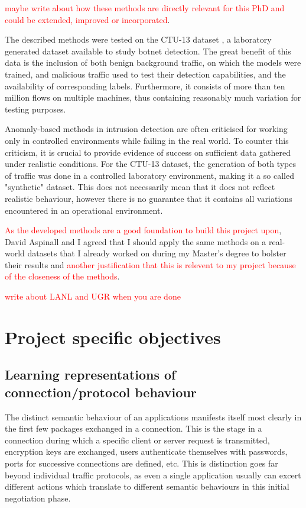 \documentclass[a4paper,12pt,twoside]{report}
\begin{document}
\textcolor{red}{maybe write about how these methods are directly relevant for this PhD and could be extended, improved or incorporated}.

The described methods were tested on the CTU-13 dataset \cite{garcia2014empirical}, a laboratory generated dataset available to study botnet detection. The great benefit of this data is the inclusion of both benign background traffic, on which the models were trained, and malicious traffic used to test their detection capabilities, and the availability of corresponding labels. Furthermore, it consists of more than ten million flows on multiple machines, thus containing reasonably much variation for testing purposes.

Anomaly-based methods in intrusion detection are often criticised for working only in controlled environments while failing in the real world. To counter this criticism, it is crucial to provide evidence of success on sufficient data gathered under realistic conditions. For the CTU-13 dataset, the generation of both types of traffic was done in a controlled laboratory environment, making it a so called "synthetic" dataset. This does not necessarily mean that it does not reflect realistic behaviour, however there is no guarantee that it contains all variations encountered in an operational environment. 

\textcolor{red}{As the developed methods are a good foundation to build this project upon}, David Aspinall and I agreed that I should apply the same methods on a real-world datasets that I already worked on during my Master's degree to bolster their results and \textcolor{red}{another justification that this is relevent to my project because of the closeness of the methods}. 

\textcolor{red}{write about LANL and UGR when you are done}

\section{Project specific objectives}


\subsection{Learning representations of connection/protocol behaviour}

The distinct semantic behaviour of an applications manifests itself most clearly in the first few packages exchanged in a connection. This is the stage in a connection during which a specific client or server request is transmitted, encryption keys are exchanged, users authenticate themselves with passwords, ports for successive connections are defined, etc. This is distinction goes far beyond individual traffic protocols, as even a single application usually can excert different actions which translate to different semantic behaviours in this initial negotiation phase. 
\end{document}

